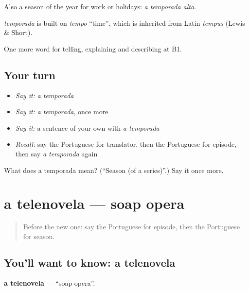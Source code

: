 Also a season of the year for work or holidays: \emph{a temporada alta}.

\begin{cousinweb}
\emph{temporada} is built on \emph{tempo} \textquotedblleft{}time\textquotedblright{}, which is inherited from Latin \emph{tempus} (Lewis \& Short).
\end{cousinweb}

\begin{grammarlens}[title={What you've built}]
One more word for telling, explaining and describing at B1.
\end{grammarlens}

\subsection*{Your turn}
\begin{itemize}
\raggedright
  \item \emph{Say it:} \emph{a temporada}
  \item \emph{Say it:} \emph{a temporada}, once more
  \item \emph{Say it:} a sentence of your own with \emph{a temporada}
  \item \emph{Recall:} say the Portuguese for translator, then the Portuguese for episode, then say \emph{a temporada} again
\end{itemize}

\begin{tcolorbox}[breakable,colback=teal!4,colframe=teal!35!black,title={Before you move on}]
What does a temporada mean? (\textquotedblleft{}Season (of a series)\textquotedblright{}.) Say it once more.
\end{tcolorbox}
\section[a telenovela]{a telenovela — soap opera}

\label{lesson:PT-C526-telenovela}



\begin{quote}
Before the new one: say the Portuguese for episode, then the Portuguese for season.
\end{quote}

\subsection*{You'll want to know: a telenovela}
\textbf{a telenovela} — \textquotedblleft{}soap opera\textquotedblright{}.

